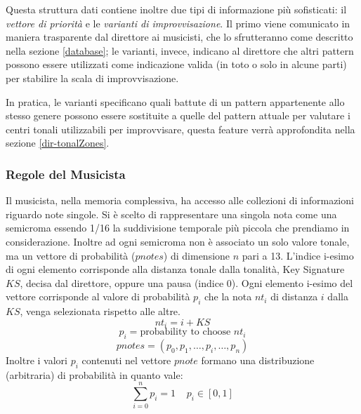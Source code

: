 Questa struttura dati contiene inoltre due tipi di informazione più sofisticati: il \emph{vettore di priorità} e le \emph{varianti di improvvisazione}. Il primo viene comunicato in maniera trasparente dal direttore ai musicisti, che lo sfrutteranno come descritto nella sezione \ref{database}; le varianti, invece, indicano al direttore che altri pattern possono essere utilizzati come indicazione valida (in toto o solo in alcune parti) per stabilire la scala di improvvisazione.

In pratica, le varianti specificano quali battute di un pattern appartenente allo stesso genere possono essere sostituite a quelle del pattern attuale per valutare i centri tonali utilizzabili per improvvisare, questa feature verrà approfondita nella sezione \ref{dir-tonalZones}.


\subsubsection*{Regole del Musicista}
\label{patterneregole}
Il musicista, nella memoria complessiva, ha accesso alle collezioni di
informazioni riguardo note singole. 
Si è scelto di rappresentare una singola nota come una semicroma essendo 
1/16 la suddivisione temporale più piccola che prendiamo in considerazione.
Inoltre ad ogni semicroma non è associato un solo valore tonale, ma un
vettore di probabilità ($pnotes$) di dimensione $n$ pari a 13. L'indice i-esimo
di ogni elemento corrisponde alla distanza tonale dalla tonalità, 
Key Signature $KS$, decisa dal direttore, oppure una pausa (indice 0). 
Ogni elemento i-esimo del vettore 
corrisponde al valore di probabilità $p_i$ che la nota $nt_i$ di distanza 
$i$ dalla $KS$, venga selezionata rispetto alle altre.
\[nt_i = i + KS \]
\[p_i = \text{probability to choose  } nt_i \]
\begin{equation}
\label{eq-pnotes}
pnotes = (p_0, p_1,  \ldots , p_i, \ldots, p_n)
\end{equation}
Inoltre i valori $p_i$ contenuti nel vettore $pnote$ formano una distribuzione 
(arbitraria) di probabilità in quanto vale:
\begin{equation}
\sum_{i=0}^{n} p_i = 1 \;\;\;\; p_i \in [0, 1]
\end{equation}


